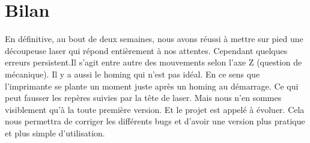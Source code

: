 \part{Bilan}

En définitive, au bout de deux semaines, nous avons réussi à mettre sur pied une découpeuse laser qui répond entièrement à nos attentes. Cependant quelques erreurs persistent.Il s'agit entre autre des mouvements selon l'axe Z (question de mécanique). Il y a aussi le homing qui n'est pas idéal. En ce sens que l'imprimante se plante un moment juste après un homing au démarrage. Ce qui peut fausser les repères suivies par la tête de laser. Mais nous n'en sommes visiblement qu'à la toute première version. Et le projet est appelé à évoluer. Cela nous permettra de corriger les différents bugs et d'avoir une version plus pratique et plus simple d'utilisation.